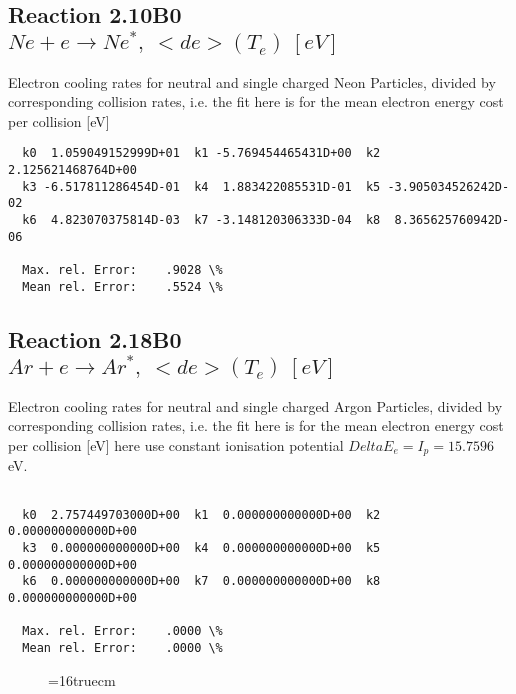 \documentclass[12pt,dvipdfmx]{article}
\begin{document}
\subsection{
Reaction 2.10B0   $  Ne + e \rightarrow Ne^*,  \ <de>(T_e) \ [eV] $
}

 Electron cooling rates for neutral and single
 charged Neon Particles, divided by corresponding collision rates, i.e. the fit here is for the mean electron energy cost per collision [eV]

\begin{small}\begin{verbatim}
  k0  1.059049152999D+01  k1 -5.769454465431D+00  k2  2.125621468764D+00
  k3 -6.517811286454D-01  k4  1.883422085531D-01  k5 -3.905034526242D-02
  k6  4.823070375814D-03  k7 -3.148120306333D-04  k8  8.365625760942D-06

  Max. rel. Error:    .9028 \%
  Mean rel. Error:    .5524 \%

\end{verbatim}\end{small}


\subsection{
Reaction 2.18B0  $   Ar + e \rightarrow Ar^*,  \ <de>(T_e) \ [eV] $
}

  Electron cooling rates for neutral and single
  charged Argon Particles, divided by corresponding collision rates, i.e. the fit here is for the mean electron energy cost per collision [eV]
  here use constant ionisation potential $Delta E_e = I_p = 15.7596$ eV.


\begin{small}\begin{verbatim}

  k0  2.757449703000D+00  k1  0.000000000000D+00  k2  0.000000000000D+00
  k3  0.000000000000D+00  k4  0.000000000000D+00  k5  0.000000000000D+00
  k6  0.000000000000D+00  k7  0.000000000000D+00  k8  0.000000000000D+00

  Max. rel. Error:    .0000 \%
  Mean rel. Error:    .0000 \%

\end{verbatim}\end{small}

\begin{figure} \label{2.18ll}
\epsfxsize=16truecm
\end{figure}
\newpage
\end{document}
